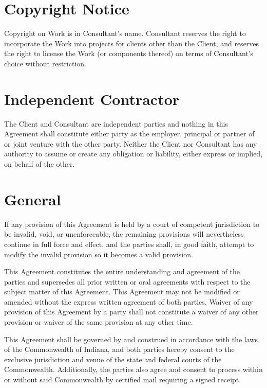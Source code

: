 \documentclass[10pt]{article}
\begin{document}
\section{Copyright Notice}

Copyright on Work is in Consultant's name.  Consultant reserves the right to incorporate the Work into projects for clients other than the Client, and reserves the right to license the Work (or components thereof) on terms of Consultant's choice without restriction.


\section{Independent Contractor}

The Client and Consultant are independent parties and nothing in this
Agreement shall constitute either party as the employer, principal or
partner of or joint venture with the other party.  Neither the Client nor
Consultant has any authority to assume or create any obligation or
liability, either express or implied, on behalf of the other.

\section{General}

If any provision of this Agreement is held by a court of competent
jurisdiction to be invalid, void, or unenforceable, the remaining provisions
will nevertheless continue in full force and effect, and the parties shall,
in good faith, attempt to modify the invalid provision so it becomes a valid
provision.

This Agreement constitutes the entire understanding and agreement of the
parties and supersedes all prior written or oral agreements with respect to
the subject matter of this Agreement. This Agreement may not be modified or
amended without the express written agreement of both parties. Waiver of any
provision of this Agreement by a party shall not constitute a waiver of any
other provision or waiver of the same provision at any other time.

This Agreement shall be governed by and construed in accordance with the
laws of the Commonwealth of Indiana, and both parties hereby consent
to the exclusive jurisdiction and venue of the state and federal courts of
the Commonwealth. Additionally, the parties also agree and consent to
process within or without said Commonwealth by certified mail requiring a
signed receipt.
\end{document}
